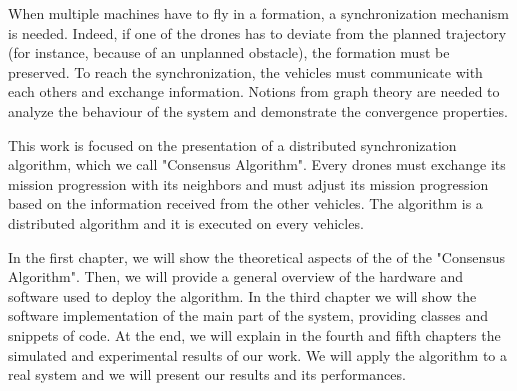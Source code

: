 When multiple machines have to fly in a formation, a synchronization mechanism is
needed. Indeed, if one of the drones has to deviate from the planned trajectory
(for instance, because of an unplanned obstacle), the formation must be preserved.
To reach the synchronization, the vehicles must communicate with each others and
exchange information.
Notions from graph theory are needed to analyze the behaviour of the system
and demonstrate the convergence properties.

This work is focused on the presentation of a distributed synchronization algorithm,
which we call "Consensus Algorithm". Every drones must exchange its mission progression
with its neighbors and must adjust its mission progression based on the information
received from the other vehicles.
The algorithm is a distributed algorithm and it is executed on every vehicles.


In the first chapter, we will show the theoretical aspects of the of the "Consensus Algorithm".
Then, we will provide a general overview of the hardware and software used to deploy the algorithm.
In the third chapter we will show the software implementation of the main part of the
system, providing classes and snippets of code.
At the end, we will explain in the fourth and fifth chapters the simulated and experimental results of
our work. We will apply the algorithm to a real system and we will present our results and its
performances.
